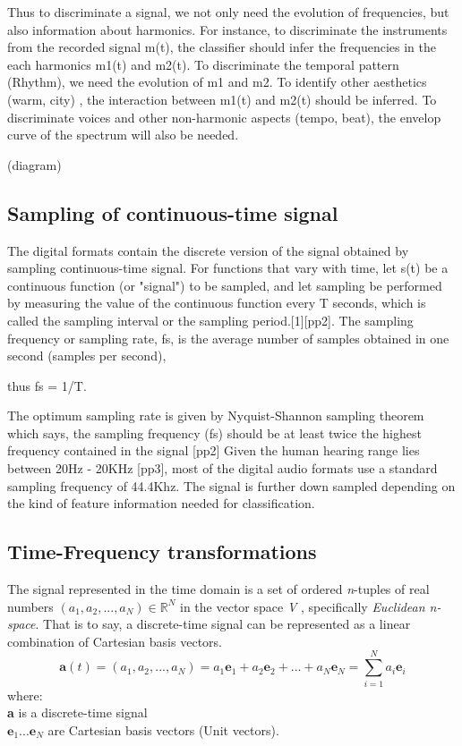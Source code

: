Thus to discriminate a signal, we not only need the evolution of frequencies, but also information about harmonics. For instance, to discriminate the instruments from the recorded signal m(t), the classifier should infer the frequencies in the each harmonics m1(t) and m2(t). To discriminate the temporal pattern (Rhythm), we need the evolution of m1 and m2. To identify other aesthetics (warm, city) , the interaction between m1(t) and m2(t) should be inferred. To discriminate voices and other non-harmonic aspects (tempo, beat), the envelop curve of the spectrum will also be needed.    

(diagram)


\subsection{Sampling of continuous-time signal}
The digital formats contain the discrete version of the signal obtained by sampling continuous-time signal. For functions that vary with time, let s(t) be a continuous function (or "signal") to be sampled, and let sampling be performed by measuring the value of the continuous function every T seconds, which is called the sampling interval or the sampling period.[1][pp2]. The sampling frequency or sampling rate, fs, is the average number of samples obtained in one second (samples per second),  

thus fs = 1/T.

The optimum sampling rate is given by Nyquist-Shannon sampling theorem which says, the sampling frequency (fs) should be at least twice the highest frequency contained in the signal [pp2] Given the human hearing range lies between 20Hz - 20KHz [pp3], most of the digital audio formats use a standard sampling frequency of 44.4Khz. The signal is further down sampled depending on the kind of feature information needed for classification. 


\subsection{Time-Frequency transformations}
The signal represented in the time domain is a set of ordered \textit{n}-tuples of real numbers \( (a_{1},a_{2}, ...,a_{N}) \in \mathbb{R}^N \) in the vector space \textit{V} , specifically \textit{Euclidean n-space}. That is to say, a discrete-time signal can be represented as a \gls{linear combination} of Cartesian \gls{basis} vectors. 
\begin{equation}
\textbf{a}(t) = (a_{1},a_{2}, ...,a_{N}) = a_{1}\textbf{e}_{1} + a_{2}\textbf{e}_{2} + ... + a_{N}\textbf{e}_{N} = \displaystyle\sum_{i=1}^{N}a_{i}\textbf{e}_{i}
\end{equation} 
where:\\
\indent \textbf{a} is a discrete-time signal\\
\indent $\textbf{e}_{1} ... \textbf{e}_{N}$ are Cartesian basis vectors (Unit vectors).
\bigskip

